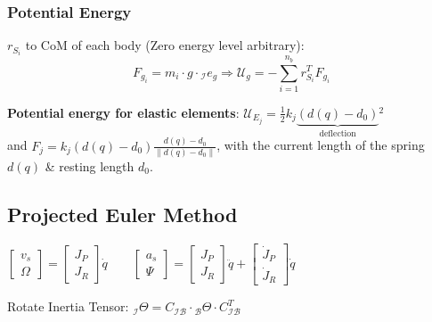 \documentclass[fontsize=6pt,DIV=calc,a4paper,ngerman]{scrartcl}
\begin{document}
\begin{multicols*}{4}
	\subsubsection{Potential Energy}
	$r_{S_i}$ to CoM of each body (Zero energy level arbitrary):
	$$F_{g_i}= m_i\cdot g\cdot {}_\mathcal{I}e_g \Rightarrow \mathcal{U}_g= -\sum_{i=1}^{n_b} r_{S_i}^TF_{g_i}$$

	\textbf{Potential energy for elastic elements}:
	$\mathcal{U}_{E_j} = \frac{1}{2} k_j\underbrace{(d(q)-d_0)}_{\text{deflection}}{}^2$\\
	and $F_j = k_j(d(q) - d_0) \frac{d(q)- d_0}{\| d(q) - d_0\|} $, with the current length of the spring $d(q)$ \& resting length $d_0$.


	\subsection{Projected Euler Method}
	$\left[\begin{smallmatrix}
				v_s \\ \Omega
			\end{smallmatrix}\right] =
		\left[\begin{smallmatrix}
				J_P \\ J_R
			\end{smallmatrix}\right] \dot{q} \qquad
		\left[\begin{smallmatrix}
				a_s \\ \Psi
			\end{smallmatrix}\right] =
		\left[\begin{smallmatrix}
				J_P \\ J_R
			\end{smallmatrix}\right] \ddot{q} + \left[\begin{smallmatrix}
				\dot{J}_P \\ \dot{J}_R
			\end{smallmatrix}\right] \dot{q}$

	Rotate Inertia Tensor: ${}_\mathcal{I}\Theta = C_\mathcal{IB}\cdot {}_\mathcal{B}\Theta \cdot C_\mathcal{IB}^T$ \\


\end{multicols*}
\end{document}
